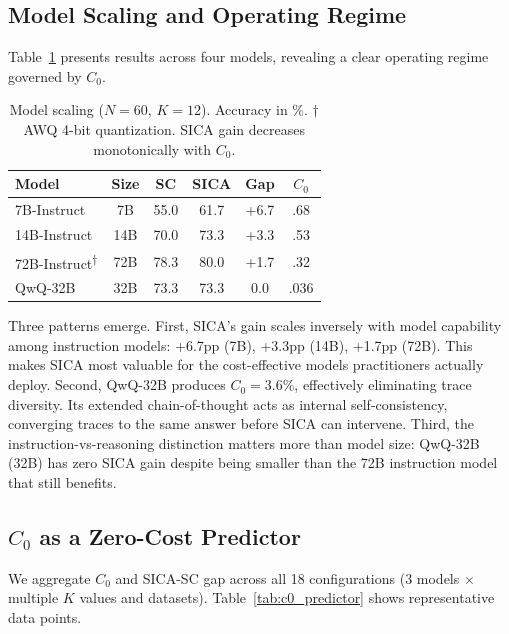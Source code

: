 \documentclass[11pt,a4paper]{article}
\begin{document}
\subsection{Model Scaling and Operating Regime}
\label{sec:scaling}

Table~\ref{tab:scaling} presents results across four models, revealing a clear operating regime governed by $C_0$.

\begin{table}[t]
\centering
\small
\begin{tabular}{lccccc}
\toprule
\textbf{Model} & \textbf{Size} & \textbf{SC} & \textbf{SICA} & \textbf{Gap} & $C_0$ \\
\midrule
7B-Instruct & 7B & 55.0 & 61.7 & +6.7 & .68 \\
14B-Instruct & 14B & 70.0 & 73.3 & +3.3 & .53 \\
72B-Instruct\textsuperscript{$\dagger$} & 72B & 78.3 & 80.0 & +1.7 & .32 \\
QwQ-32B & 32B & 73.3 & 73.3 & 0.0 & .036 \\
\bottomrule
\end{tabular}
\caption{Model scaling ($N\!=\!60$, $K\!=\!12$). Accuracy in \%. $\dagger$AWQ 4-bit quantization. SICA gain decreases monotonically with $C_0$.}
\label{tab:scaling}
\end{table}

Three patterns emerge. First, SICA's gain scales inversely with model capability among instruction models: +6.7pp (7B), +3.3pp (14B), +1.7pp (72B). This makes SICA most valuable for the cost-effective models practitioners actually deploy. Second, QwQ-32B produces $C_0 = 3.6\%$, effectively eliminating trace diversity. Its extended chain-of-thought acts as internal self-consistency, converging traces to the same answer before SICA can intervene. Third, the instruction-vs-reasoning distinction matters more than model size: QwQ-32B (32B) has zero SICA gain despite being smaller than the 72B instruction model that still benefits.

\subsection{$C_0$ as a Zero-Cost Predictor}
\label{sec:c0_analysis}

We aggregate $C_0$ and SICA-SC gap across all 18 configurations (3 models $\times$ multiple $K$ values and datasets). Table~\ref{tab:c0_predictor} shows representative data points.
\end{document}
